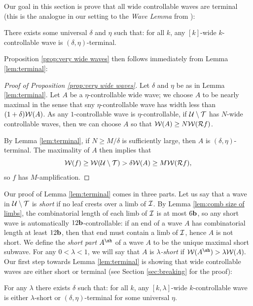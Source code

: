 \documentclass[12pt]{amsart}
\begin{document}
Our goal in this section is prove that all wide controllable waves are terminal (this is the analogue in our setting to the \emph{Wave Lemma} from \cite[Lemma 5.1]{dudko2023mlcfeigenbaumpoints}):
\begin{lem}\label{lem:terminal}
	There exists some universal $\delta$ and $\eta$ such that: for all $k$,  any $[k]$-wide $k$-controllable wave is $(\delta, \eta)$-terminal.
\end{lem}


Proposition \ref{prop:very wide waves} then follows immediately from 
Lemma \ref{lem:terminal}:
\begin{proof}[Proof of Proposition \ref{prop:very wide waves}]
	Let $\delta$ and $\eta$ be as in Lemma \ref{lem:terminal}.
	Let $A$ be a $\eta$-controllable wide wave; we choose $A$ to be nearly maximal in the sense that sny $\eta$-controllable wave has width less than $(1+\delta)\mathcal W(A)$.
    As any $1$-controllable wave is $\eta$-controllable, if $\mathcal U\setminus \mathcal T$ has $N$-wide controllable waves, then we can choose $A$ so that
	$\mathcal W(A)\geq N \mathcal W(\mathcal R f)$.
	
	By Lemma \ref{lem:terminal}, if $N\geq M/\delta$ is sufficiently large, then $A$ is $(\delta, \eta)$-terminal. 
	The maximality of $A$ then implies that 
	$$\mathcal W(f) \geq \mathcal W(\mathcal U\setminus \mathcal T)> \delta\mathcal W(A)\geq M\mathcal W(\mathcal R f),$$
	so $f$ has $M$-amplification.
\end{proof}


Our proof of Lemma \ref{lem:terminal} comes in three parts. 
Let us say that a wave  in $\mathcal U\setminus \mathcal T$ is \textit{short} if no leaf crests over a limb of $\mathcal I$. 
By Lemma \ref{lem:comb size of limbs}, the combinatorial length of each limb of $\mathcal I$ is at most $6\mathbf b$, so any short wave is automatically $12\mathbf b$-controllable: if an end of a wave $A$ has combinatorial length at least $12\mathbf b$, then that end must contain a limb of $\mathcal I$, hence $A$ is not short.
We define the \textit{short part} $A^\sh$ of a wave $A$ to be the unique maximal short subwave.
For any $0< \lambda< 1$, we will say that $A$ is \textit{$\lambda$-short}  if $\WW(A^\sh)> \lambda\WW(A).$
Our first 
step towards Lemma \ref{lem:terminal} is showing that wide controllable waves are either short or terminal (see Section \ref{sec:breaking} for the proof):
\begin{prop}\label{prop:mostly short}
	For any $\lambda$ there exists $\delta$ such that: for all $k$, any $[k, \lambda]$-wide $k$-controllable wave is either $\lambda$-short or $(\delta, \eta)$-terminal for some universal $\eta$.
\end{prop}
\end{document}
